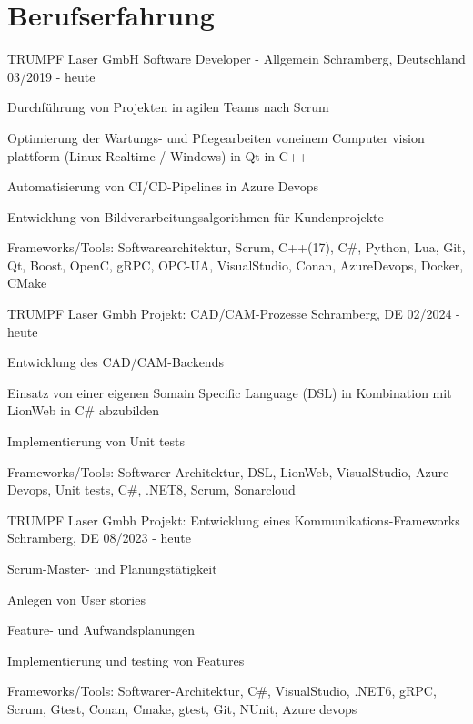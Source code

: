\section{Berufserfahrung}

\cventry
{TRUMPF Laser GmbH} %
{Software Developer - Allgemein} %
{Schramberg, Deutschland} %
{03/2019 - heute} %
\begin{cvitems}
\item{Durchführung von Projekten in agilen Teams nach Scrum}
\item{Optimierung der Wartungs- und Pflegearbeiten voneinem Computer vision plattform (Linux Realtime / Windows) in Qt in C++}
\item{Automatisierung von CI/CD-Pipelines in Azure Devops}
\item{Entwicklung von Bildverarbeitungsalgorithmen für Kundenprojekte}
\item{Frameworks/Tools: Softwarearchitektur, Scrum,  C++(17), C\#, Python, Lua, Git, Qt, Boost, OpenC, gRPC, OPC-UA, VisualStudio, Conan, AzureDevops, Docker, CMake}
\end{cvitems}

\cventry
{TRUMPF Laser Gmbh} %
{Projekt: CAD/CAM-Prozesse} %
{Schramberg, DE} %
{02/2024 - heute} %
\begin{cvitems}
	\item{Entwicklung des CAD/CAM-Backends}
	\item{Einsatz von einer eigenen Somain Specific Language (DSL) in Kombination mit LionWeb in C\# abzubilden}
	\item{Implementierung von Unit tests}
	\item{Frameworks/Tools: Softwarer-Architektur, DSL, LionWeb, VisualStudio, Azure Devops, Unit tests, C\#, .NET8, Scrum, Sonarcloud}
\end{cvitems}

\cventry
{TRUMPF Laser Gmbh} %
{Projekt: Entwicklung eines Kommunikations-Frameworks } %
{Schramberg, DE} %
{08/2023 - heute} %
\begin{cvitems}
	\item{Scrum-Master- und Planungstätigkeit}
	\item{Anlegen von User stories}
	\item{Feature- und Aufwandsplanungen}
	\item{Implementierung und testing von Features}
	\item {Frameworks/Tools:  Softwarer-Architektur, C\#, VisualStudio, .NET6, gRPC, Scrum,  Gtest, Conan, Cmake, gtest, Git, NUnit, Azure devops }
\end{cvitems}


